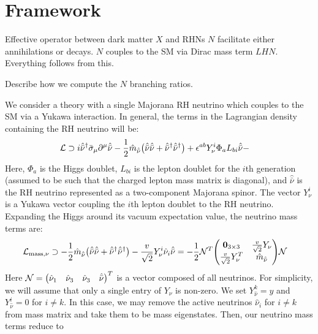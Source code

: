 \documentclass[a4paper,11pt]{article} \pdfoutput=1
\begin{document}
\section{Framework}
\label{sec:framework}

Effective operator between dark matter $X$ and RHNs $N$ facilitate either annihilations or decays. $N$ couples to the SM via Dirac mass term $LHN$. Everything follows from this.

Describe how we compute the $N$ branching ratios.

We consider a theory with a single Majorana RH neutrino which couples to the SM
via a Yukawa interaction. In general, the terms in the Lagrangian density containing
the RH neutrino will be:
\begin{align}
	\mathcal{L}
	 & \supset
	i\hat{\bar{\nu}}^{\dagger}\bar{\sigma}_{\mu}\partial^{\mu}\hat{\bar{\nu}}
	- \frac{1}{2}\hat{m}_{\hat{\bar{\nu}}}\qty(\hat{\bar{\nu}}\hat{\bar{\nu}} + \hat{\bar{\nu}}^{\dagger}\hat{\bar{\nu}}^{\dagger})
	+ \epsilon^{ab}Y^{i}_{\nu}\Phi_{a}L_{bi}\hat{\bar{\nu}} -
\end{align}
Here, \(\Phi_{a}\) is the Higgs doublet, \(L_{bi}\) is the lepton doublet for
the \(i\)th generation (assumed to be such that the charged lepton mass matrix is diagonal),
and \(\hat{\bar{\nu}}\) is the RH neutrino represented as a two-component
Majorana spinor. The vector \(Y^{i}_{\nu}\) is a Yukawa vector coupling the
\(i\)th lepton doublet to the RH neutrino. Expanding the Higgs around its vacuum
expectation value, the neutrino mass terms are:
\begin{align}
	\mathcal{L}_{\mathrm{mass},\nu}
	                        & \supset
	- \frac{1}{2}\hat{m}_{\hat{\bar{\nu}}}\qty(\hat{\bar{\nu}}\hat{\bar{\nu}} + \hat{\bar{\nu}}^{\dagger}\hat{\bar{\nu}}^{\dagger})
	- \frac{v}{\sqrt{2}}Y^{i}_{\nu}\hat{\nu}_{i}\hat{\bar{\nu}}
	=
	-\frac{1}{2}
	\mathcal{N}^{T}
	\mqty(\bm{0}_{3\times3} & \frac{v}{\sqrt{2}}Y_{\nu} \\ \frac{v}{\sqrt{2}}Y^{T}_{\nu} & \hat{m}_{\hat{\bar{\nu}}})
	\mathcal{N}
\end{align}
Here \(\mathcal{N} = \mqty(\hat{\nu}_1 & \hat{\nu}_3 &\hat{\nu}_3&\hat{\bar{\nu}})^{T}\)
is a vector composed of all neutrinos. For simplicity, we will assume that only
a single entry of \(Y_{\nu}\) is non-zero. We set \(Y^{k}_{\hat{\nu}} = y\)
and \(Y^{i}_{\hat{\nu}} = 0\) for \(i\neq k\). In this case, we may remove
the active neutrinos \(\hat{\nu}_{i}\) for \(i\neq k\) from mass matrix and
take them to be mass eigenstates. Then, our neutrino mass terms reduce to
\end{document}
